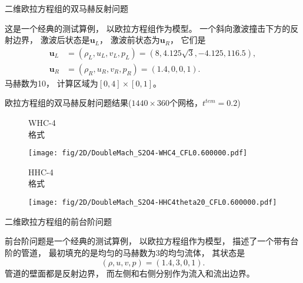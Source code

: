 \documentclass[aspectratio=169]{beamer}
\begin{document}
\begin{frame}{二维欧拉方程组的双马赫反射问题}
  
  \begin{example}[二维欧拉方程组的双马赫反射问题]
    \label{ex:DoubleMach}
    这是一个经典的测试算例，
    以欧拉方程组作为模型。
    一个斜向激波撞击下方的反射边界，
    激波后状态是${\bm u}_L$，
    激波前状态为${\bm u}_R$，
    它们是
    \begin{align*}
      {\bm u}_L & =(\rho_L, u_L, v_L, p_L)= (8, 4.125\sqrt{3}, -4.125, 116.5), \\
      {\bm u}_R & =(\rho_R, u_R, v_R, p_R)= (1.4, 0, 0, 1).
    \end{align*}
    马赫数为10，
    计算区域为$[0,4]\times[0,1]$。
  \end{example}
  
\end{frame}

\begin{frame}{欧拉方程组的双马赫反射问题结果($1440 \times 360$个网格，$t^{tem}=0.2$)}
  
  \vspace{-4mm}
  \begin{figure}[htbp]
    \centering
    
    \begin{multicols}{8}
      \begin{minipage}{0.25\textwidth}
        \vspace{0.1\textheight}
        WHC-4\\格式
      \end{minipage}
      \texttt{[image: fig/2D/DoubleMach\_S2O4-WHC4\_CFL0.600000.pdf]}
    \end{multicols}
    
    \begin{multicols}{8}
      \begin{minipage}{0.25\textwidth}
        \vspace{0.14\textheight}
        HHC-4\\格式
      \end{minipage}
      \texttt{[image: fig/2D/DoubleMach\_S2O4-HHC4theta20\_CFL0.600000.pdf]}
    \end{multicols}
  \end{figure}
  
\end{frame}

\begin{frame}{二维欧拉方程组的前台阶问题}
  
  \begin{example}[二维欧拉方程组的前台阶问题]
    \label{ex:Frontstep}
    前台阶问题是一个经典的测试算例，
    以欧拉方程组作为模型，
    描述了一个带有台阶的管道，
    最初填充的是均匀的马赫数为$3$的均匀流体，
    其状态是
    \begin{equation*}
      (\rho, u, v, p)= (1.4, 3, 0, 1).
    \end{equation*}
    管道的壁面都是反射边界，
    而左侧和右侧分别作为流入和流出边界。
  \end{example}
  
\end{frame}
\end{document}

